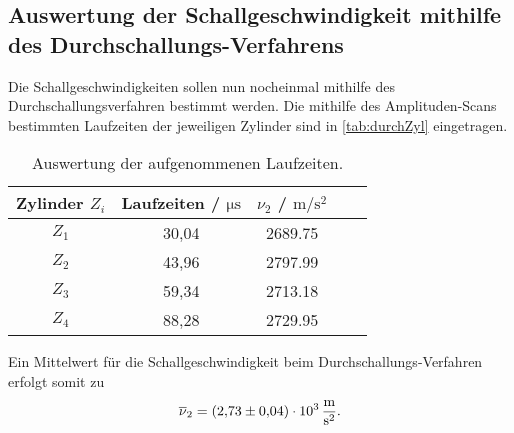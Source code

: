 \subsection{Auswertung der Schallgeschwindigkeit mithilfe des Durchschallungs-Verfahrens}
\label{subsec:schallDurch}

Die Schallgeschwindigkeiten sollen nun nocheinmal mithilfe des Durchschallungsverfahren bestimmt werden.
Die mithilfe des Amplituden-Scans bestimmten Laufzeiten der jeweiligen Zylinder sind in \autoref{tab:durchZyl} eingetragen.

\begin{table}
  \centering
  \caption{Auswertung der aufgenommenen Laufzeiten.}
  \label{tab:durchZyl}
  \begin{tabular}{c c c c c}
    \toprule
    Zylinder $Z_i$ &  Laufzeiten / $\si{\micro\second}$ & $\nu_2$ / $\si{\meter\per\second\squared} $\\
    \midrule
    $Z_1$ & 30,04 & 2689.75 \\
    $Z_2$ & 43,96 & 2797.99 \\
    $Z_3$ & 59,34 & 2713.18 \\
    $Z_4$ & 88,28 & 2729.95 \\
    \bottomrule
  \end{tabular}
\end{table}

Ein Mittelwert für die Schallgeschwindigkeit beim Durchschallungs-Verfahren erfolgt somit zu
\begin{align*}
  \overline \nu_2 = \SI{2,73 \pm 0,04 e3}{\meter\per\second\squared}.
\end{align*}
